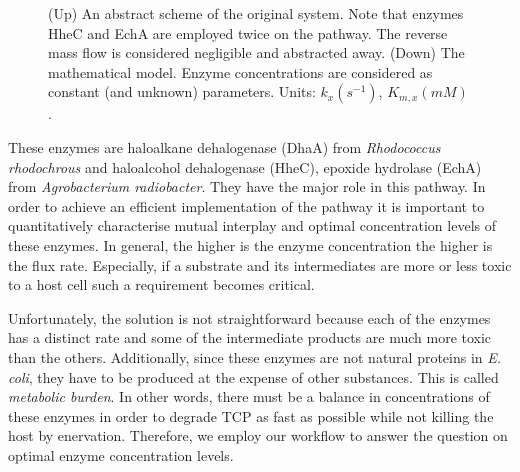 \documentclass{llncs}
\begin{document}
\begin{figure}
\begin{center}
\vspace*{-4.5mm}
    \end{center}
\caption{
(Up) An abstract scheme of the original system. %
Note that enzymes HheC and EchA are employed twice on the pathway. The reverse mass flow is considered negligible and abstracted away. (Down) The mathematical model. Enzyme concentrations are considered as constant (and unknown) parameters. Units: $k_x (s^{-1})$, $K_{m,x} (mM)$.
}
\label{fig:enzymatic-pathway}
\vspace*{-5mm}
\end{figure}

These enzymes are  haloalkane dehalogenase (DhaA) from \emph{Rhodococcus rhodo\-chrous} and haloalcohol dehalogenase (HheC), epoxide hydrolase (EchA) from \emph{Agrobacterium radiobacter}. They have the major role in this pathway. In order to achieve an efficient implementation of the pathway it is important to quantitatively characterise mutual interplay and optimal concentration levels of these enzymes. In general, the higher is the enzyme concentration the higher is the flux rate. Especially, if a substrate and its intermediates are more or less toxic to a host cell such a requirement becomes critical. 

Unfortunately, the solution is not straightforward because each of the enzymes has a distinct rate and some of the intermediate products are much more toxic than the others. Additionally, since these enzymes are not natural proteins in \emph{E. coli}, they have to be produced at the expense of other substances. This is called \emph{metabolic burden}. In other words, there must be a balance in concentrations of these enzymes in order to degrade TCP as fast as possible while not killing the host by enervation. Therefore, we employ our workflow to answer the question on optimal enzyme concentration levels. %
\end{document}
